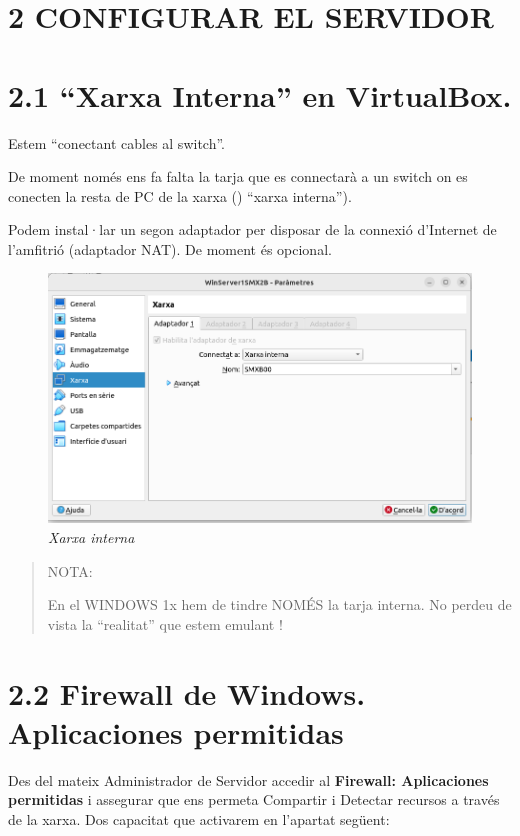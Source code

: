 \documentclass[
  a4paper,
]{article}
\begin{document}
\section{2 CONFIGURAR EL SERVIDOR}\label{configurar-el-servidor}

\section{2.1 ``Xarxa Interna'' en
VirtualBox.}\label{xarxa-interna-en-virtualbox.}

Estem ``conectant cables al switch''.

De moment només ens fa falta la tarja que es connectarà a un switch on
es conecten la resta de PC de la xarxa () ``xarxa interna'').

Podem instal·lar un segon adaptador per disposar de la connexió
d'Internet de l'amfitrió (adaptador NAT). De moment és opcional.

\begin{figure}
\centering
\includegraphics{png/ADDS/xarxainterna.png}
\caption{\emph{Xarxa interna}}
\end{figure}

\begin{quote}
NOTA:

En el WINDOWS 1x hem de tindre NOMÉS la tarja interna. No perdeu de
vista la ``realitat'' que estem emulant !
\end{quote}

\section{2.2 Firewall de Windows. Aplicaciones
permitidas}\label{firewall-de-windows.-aplicaciones-permitidas}

Des del mateix Administrador de Servidor accedir al \textbf{Firewall:
Aplicaciones permitidas} i assegurar que ens permeta Compartir i
Detectar recursos a través de la xarxa. Dos capacitat que activarem en
l'apartat següent:
\end{document}
